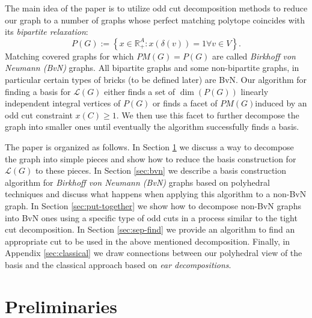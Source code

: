 \documentclass[11pt]{article}
\newcommand{\1}{\mathbf{1}}
\newcommand{\0}{\mathbf{0}}
\newcommand{\zL}{\mathcal L}
\newcommand{\R}{\mathbb{R}}
\begin{document}
The main idea of the paper is to utilize odd cut decomposition methods to reduce our graph to a number of graphs whose perfect matching polytope coincides with its \emph{bipartite relaxation}:\begin{equation}\label{eq:pm-bipartite}
    P(G):=\left\{x\in \R^A_{+}: x(\delta(v))= 1  \forall v\in V \right\}.
\end{equation} 
Matching covered graphs for which $PM(G)=P(G)$ are called \emph{Birkhoff von Neumann (BvN)} graphs. All bipartite graphs and some non-bipartite graphs, in particular certain types of bricks (to be defined later) are BvN. Our algorithm for finding a basis for $\zL(G)$ either finds a set of $\dim(P(G))$ linearly independent integral vertices of $P(G)$ or finds a facet of $PM(G)$induced by an odd cut constraint $x(C)\geq 1$. We then use this facet to further decompose the graph into smaller ones until eventually the algorithm successfully finds a basis.

The paper is organized as follows. In Section \ref{sec:prelim} we discuss a way to decompose the graph into simple pieces and show how to reduce the basis construction for $\zL(G)$ to these pieces. In Section \ref{sec:bvn} we describe a basis construction algorithm for \emph{Birkhoff von Neumann (BvN)} graphs based on polyhedral techniques and discuss what happens when applying this algorithm to a non-BvN graph. In Section \ref{sec:put-together} we show how to decompose non-BvN graphs into BvN ones using a specific type of odd cuts in a process similar to the tight cut decomposition. In Section \ref{sec:sep-find} we provide an algorithm to find an appropriate cut to be used in the above mentioned decomposition. Finally, in Appendix \ref{sec:classical} we draw connections between our polyhedral view of the basis and the classical approach based on \emph{ear decompositions}.  

\section{Preliminaries}\label{sec:prelim}
\end{document}
